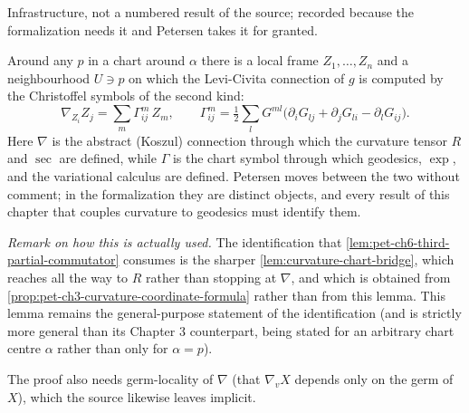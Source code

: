 \begin{lemma}
  \label{lem:chart-connection-bridge}
  \leanok
  Infrastructure, not a numbered result of the source; recorded because the
  formalization needs it and Petersen takes it for granted.

  Around any $p$ in a chart around $\alpha$ there is a local frame $Z_1,\dots,Z_n$
  and a neighbourhood $U\ni p$ on which the Levi-Civita connection of $g$ is
  computed by the Christoffel symbols of the second kind:
  \[
    \nabla_{Z_i}Z_j=\sum_m\Gamma^m_{ij}\,Z_m,\qquad
    \Gamma^m_{ij}=\tfrac12\sum_lG^{ml}\big(\partial_iG_{lj}+\partial_jG_{li}
      -\partial_lG_{ij}\big).
  \]
  Here $\nabla$ is the abstract (Koszul) connection through which the curvature
  tensor $R$ and $\sec$ are defined, while $\Gamma$ is the chart symbol through
  which geodesics, $\exp$, and the variational calculus are defined. Petersen
  moves between the two without comment; in the formalization they are distinct
  objects, and every result of this chapter that couples curvature to geodesics
  must identify them.

  \emph{Remark on how this is actually used.} The identification that
  \cref{lem:pet-ch6-third-partial-commutator} consumes is the sharper
  \cref{lem:curvature-chart-bridge}, which reaches all the way to $R$ rather than
  stopping at $\nabla$, and which is obtained from
  \cref{prop:pet-ch3-curvature-coordinate-formula} rather than from this lemma.
  This lemma remains the general-purpose statement of the identification (and is
  strictly more general than its Chapter 3 counterpart, being stated for an
  arbitrary chart centre $\alpha$ rather than only for $\alpha=p$).

  The proof also needs germ-locality of $\nabla$ (that $\nabla_vX$ depends only on
  the germ of $X$), which the source likewise leaves implicit.
\end{lemma}

